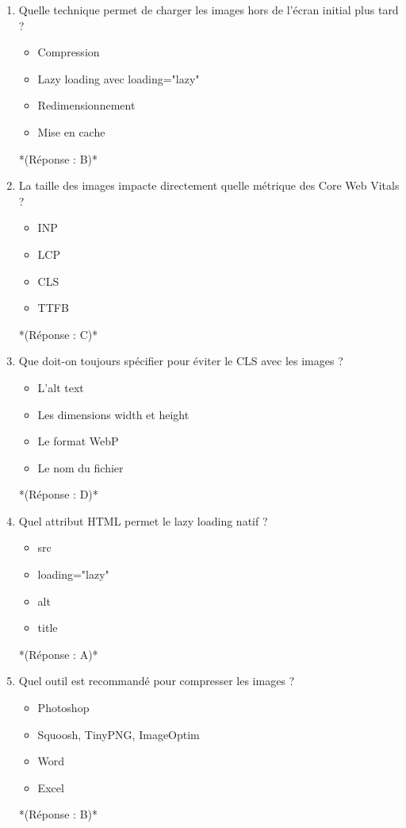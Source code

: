 \documentclass[12pt,a4paper,twoside]{report}
\begin{document}
\begin{enumerate}
\item Quelle technique permet de charger les images hors de l'écran initial plus tard ?
\begin{itemize}
\item[A)] Compression
\item[B)] Lazy loading avec loading="lazy"
\item[C)] Redimensionnement
\item[D)] Mise en cache
\end{itemize}
*(Réponse : B)*

\item La taille des images impacte directement quelle métrique des Core Web Vitals ?
\begin{itemize}
\item[A)] INP
\item[B)] LCP
\item[C)] CLS
\item[D)] TTFB
\end{itemize}
*(Réponse : C)*

\item Que doit-on toujours spécifier pour éviter le CLS avec les images ?
\begin{itemize}
\item[A)] L'alt text
\item[B)] Les dimensions width et height
\item[C)] Le format WebP
\item[D)] Le nom du fichier
\end{itemize}
*(Réponse : D)*

\item Quel attribut HTML permet le lazy loading natif ?
\begin{itemize}
\item[A)] src
\item[B)] loading="lazy"
\item[C)] alt
\item[D)] title
\end{itemize}
*(Réponse : A)*

\item Quel outil est recommandé pour compresser les images ?
\begin{itemize}
\item[A)] Photoshop
\item[B)] Squoosh, TinyPNG, ImageOptim
\item[C)] Word
\item[D)] Excel
\end{itemize}
*(Réponse : B)*


\end{enumerate}
\end{document}
